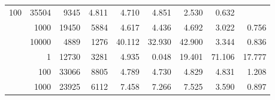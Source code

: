 \begin{table}
\begin{tabular}{rrrrrrrrr}
					\multirow{ 1 }{*}{ 100 } &
					
						
							    
							     35504  & 9345  
	                           & 4.811 & 4.710 & 4.851
	                           & 2.530 & 0.632  \\
	                
	            
					 &  
					 
					\multirow{ 1 }{*}{ 1000 } &
					
						
							    
							     19450  & 5884  
	                           & 4.617 & 4.436 & 4.692
	                           & 3.022 & 0.756  \\
	                
	            
					 &  
					 
					\multirow{ 1 }{*}{ 10000 } &
					
						
							    
							     4889  & 1276  
	                           & 40.112 & 32.930 & 42.900
	                           & 3.344 & 0.836  \\
	                
	            
	        
				\noalign{\smallskip}\hline
				\multirow{ 4 }{*}{ 250000 } &
				
					
					 
					\multirow{ 1 }{*}{ 1 } &
					
						
							    
							     12730  & 3281  
	                           & 4.935 & 0.048 & 19.401
	                           & 71.106 & 17.777  \\
	                
	            
					 &  
					 
					\multirow{ 1 }{*}{ 100 } &
					
						
							    
							     33066  & 8805  
	                           & 4.789 & 4.730 & 4.829
	                           & 4.831 & 1.208  \\
	                
	            
					 &  
					 
					\multirow{ 1 }{*}{ 1000 } &
					
						
							    
							     23925  & 6112  
	                           & 7.458 & 7.266 & 7.525
	                           & 3.590 & 0.897  \\
	                

\end{tabular}
\end{table}
